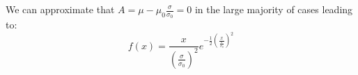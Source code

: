 \begin{appendices}
        We can approximate that $A=\mu-\mu_0\frac{\sigma}{\sigma_0}=0$ in the large majority of cases leading to:
        \begin{equation}
        f(x)=\frac{x}{(\frac{\sigma}{\sigma_0})^2}e^{-\frac{1}{2}(\frac{x}{\frac{\sigma}{\sigma_0}})^2}
        \label{eq1}
        \end{equation}

    \end{appendices}
